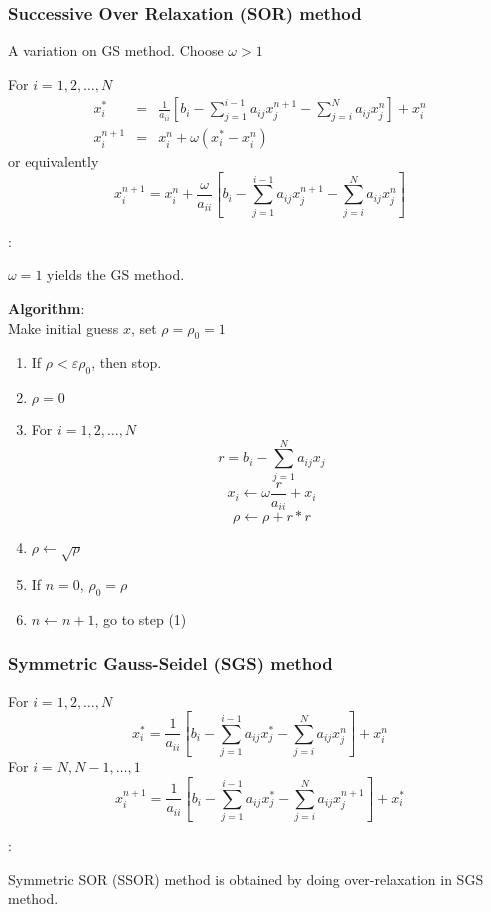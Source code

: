 \documentclass[10pt,xcolor=svgnames]{beamer}
\newcommand\remark[1]{%
  \vspace{2mm}
  \par\noindent {\bf Remark}: 
  #1\par
}
\begin{document}
\begin{frame}[allowframebreaks]
\frametitle{Successive Over Relaxation (SOR) method}
A variation on GS method. Choose $\omega > 1$\\
\vspace{5mm}

For $i=1,2,\ldots,N$
\begin{eqnarray*}
x_i^{*} &=& \frac{1}{a_{ii}}\left[ b_i - \sum_{j=1}^{i-1} a_{ij} x_j^{n+1} - \sum_{j=i}^N a_{ij} x_j^n \right] + x_i^n \\
x_i^{n+1} &=& x_i^n + \omega (x_i^* - x_i^n)
\end{eqnarray*}
or equivalently
\[
x_i^{n+1} = x_i^n + \frac{\omega}{a_{ii}}\left[ b_i - \sum_{j=1}^{i-1} a_{ij} x_j^{n+1} - \sum_{j=i}^N a_{ij} x_j^n \right]
\]

\remark{
$\omega=1$ yields the GS method.
}



\pagebreak

{\bf Algorithm}:\\
\vspace{2mm}
Make initial guess $x$, set $\rho = \rho_0 = 1$
\begin{enumerate}
\item If $\rho < \varepsilon \rho_0$, then stop.
\item $\rho = 0$
\item For $i=1,2,\ldots,N$
\[
r = b_i - \sum_{j=1}^N a_{ij} x_j
\]
\[
x_i \leftarrow \omega \frac{ r}{a_{ii}} + x_i
\]
\[
\rho \leftarrow \rho + r * r
\]
\item $\rho \leftarrow \sqrt{\rho}$
\item If $n = 0$, $\rho_0 = \rho$
\item $n \leftarrow n + 1$, go to step (1)
\end{enumerate}

\end{frame}
\begin{frame}[allowframebreaks]
\frametitle{Symmetric Gauss-Seidel (SGS) method}
For $i=1,2,\ldots,N$
\[
x_i^{*} = \frac{1}{a_{ii}}\left[ b_i - \sum_{j=1}^{i-1} a_{ij} x_j^{*} - \sum_{j=i}^N a_{ij} x_j^n \right] + x_i^n
\]
For $i=N,N-1,\ldots,1$
\[
x_i^{n+1} = \frac{1}{a_{ii}}\left[ b_i - \sum_{j=1}^{i-1} a_{ij} x_j^{*} - \sum_{j=i}^N a_{ij} x_j^{n+1} \right] + x_i^*
\]

\remark{
Symmetric SOR (SSOR) method is obtained by doing over-relaxation in SGS method.
}
\end{frame}
\end{document}
